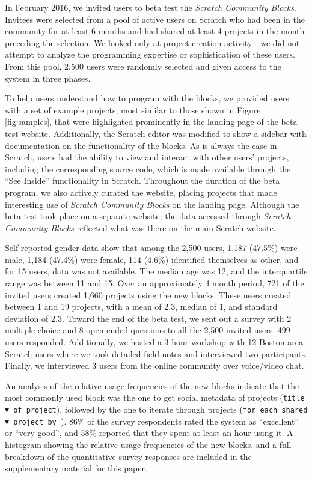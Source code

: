 \documentclass{sigchi}
\begin{document}
In February 2016, we invited users to beta test the \emph{Scratch Community Blocks}. Invitees were selected from a pool of active users on Scratch who had been in the community for at least 6 months and had shared at least 4 projects in the month preceding the selection. We looked only at project creation activity---we did not attempt to analyze the programming expertise or sophistication of these users. From this pool, 2,500 users were randomly selected and given access to the system in three phases. 
 
To help users understand how to program with the blocks, we provided users with a set of example projects, most similar to those shown in Figure \ref{fig:samples}, that were highlighted prominently in the landing page of the beta-test website. Additionally, the Scratch editor was modified to show a sidebar with documentation on the functionality of the blocks. As is always the case in Scratch, users had the ability to view and interact with other users' projects, including the corresponding source code, which is made available through the ``See Inside'' functionality in Scratch. Throughout the duration of the beta program, we also actively curated the website, placing projects that made interesting use of \emph{Scratch Community Blocks} on the landing page. Although the beta test took place on a separate website; the data accessed through \emph{Scratch Community Blocks} reflected what was there on the main Scratch website.

Self-reported gender data show that among the 2,500 users, 1,187 (47.5\%) were male, 1,184 (47.4\%) were female, 114 (4.6\%) identified themselves as other, and for 15 users, data was not available. The median age was 12, and the interquartile range was between 11 and 15. Over an approximately 4 month period, 721 of the invited users created 1,660 projects using the new blocks. These users created between 1 and 19 projects, with a mean of 2.3, median of 1, and standard deviation of 2.3. Toward the end of the beta test, we sent out a survey with 2 multiple choice and 8 open-ended questions to all the 2,500 invited users. 499 users responded. Additionally, we hosted a 3-hour workshop with 12 Boston-area Scratch users where we took detailed field notes and interviewed two participants. Finally, we interviewed 3 users from the online community over voice/video chat.

An analysis of the relative usage frequencies of the new blocks indicate that the most commonly used block was the one to get social metadata of projects (\texttt{title$\blacktriangledown$ of project}), followed by the one to iterate through projects (\texttt{for each shared$\blacktriangledown$ project by \underline{\hspace{0.5cm}}}). 86\% of the survey respondents rated the system as ``excellent'' or ``very good'', and 58\% reported that they spent at least an hour using it. A histogram showing the relative usage frequencies of the new blocks, and a full breakdown of the quantitative survey responses are included in the supplementary material for this paper.
\end{document}
